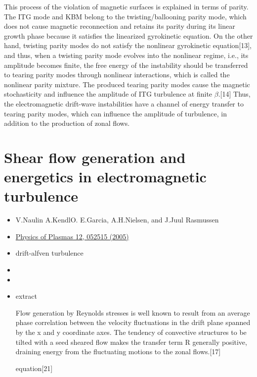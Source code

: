 \documentclass[11pt,a4paper]{article}
\begin{document}
\begin{itemize}
	This process of the violation of magnetic surfaces is explained in terms of parity. The ITG mode and KBM belong to the twisting/ballooning parity mode, which does not cause magnetic reconnection and retains its parity during its linear growth phase because it satisfies the linearized gyrokinetic equation. On the other hand, twisting parity modes do not satisfy the nonlinear gyrokinetic equation[13], and thus, when a twisting parity mode evolves into the nonlinear regime, i.e., its amplitude becomes finite, the free energy of the instability should be transferred to tearing parity modes through nonlinear interactions, which is called the nonlinear parity mixture. The produced tearing parity modes cause the magnetic stochasticity and influence the amplitude of ITG turbulence at finite $\beta$.[14] Thus, the electromagnetic drift-wave instabilities have a channel of energy transfer to tearing parity modes, which can influence the amplitude of turbulence, in addition to the production of zonal flows.
	
	\end{itemize}

\newpage

\section{Shear flow generation and energetics in electromagnetic turbulence}
	\begin{itemize}
		\item V.Naulin A.KendlO. E.Garcia, A.H.Nielsen, and J.Juul Rasmussen
		\item \href{https://aip.scitation.org/doi/10.1063/1.1905603}{Physics of Plasmas 12, 052515 (2005)} 
		\item drift-alfven turbulence
		\item 
		\item 
	\item extract 
	
	Flow generation by Reynolds stresses is well known to result from an average phase correlation between the velocity fluctuations in the drift plane spanned by the x and y coordinate axes. The tendency of convective structures to be tilted with a seed sheared flow makes the transfer term R generally positive, draining energy from the fluctuating motions to the zonal flows.[17]
		
	equation[21]
	
	
	
	\end{itemize}
\end{document}
